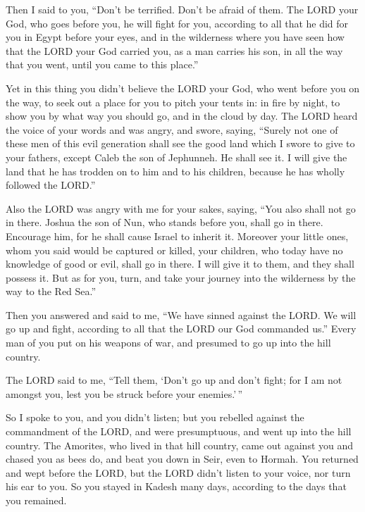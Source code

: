  Then I said to you, ``Don't be terrified. Don't be
afraid of them.  The LORD your God, who goes before you,
he will fight for you, according to all that he did for you in Egypt
before your eyes,  and in the wilderness where you have
seen how that the LORD your God carried you, as a man carries his son,
in all the way that you went, until you came to this place.''

 Yet in this thing you didn't believe the LORD your God,
 who went before you on the way, to seek out a place for
you to pitch your tents in: in fire by night, to show you by what way
you should go, and in the cloud by day.  The LORD heard
the voice of your words and was angry, and swore, saying,
 ``Surely not one of these men of this evil generation
shall see the good land which I swore to give to your fathers,
 except Caleb the son of Jephunneh. He shall see it. I
will give the land that he has trodden on to him and to his children,
because he has wholly followed the LORD.''

 Also the LORD was angry with me for your sakes, saying,
``You also shall not go in there.  Joshua the son of Nun,
who stands before you, shall go in there. Encourage him, for he shall
cause Israel to inherit it.  Moreover your little ones,
whom you said would be captured or killed, your children, who today have
no knowledge of good or evil, shall go in there. I will give it to them,
and they shall possess it.  But as for you, turn, and
take your journey into the wilderness by the way to the Red Sea.''

 Then you answered and said to me, ``We have sinned
against the LORD. We will go up and fight, according to all that the
LORD our God commanded us.'' Every man of you put on his weapons of war,
and presumed to go up into the hill country.

 The LORD said to me, ``Tell them, `Don't go up and don't
fight; for I am not amongst you, lest you be struck before your
enemies.'\,''

 So I spoke to you, and you didn't listen; but you
rebelled against the commandment of the LORD, and were presumptuous, and
went up into the hill country.  The Amorites, who lived
in that hill country, came out against you and chased you as bees do,
and beat you down in Seir, even to Hormah.  You returned
and wept before the LORD, but the LORD didn't listen to your voice, nor
turn his ear to you.  So you stayed in Kadesh many days,
according to the days that you remained.

